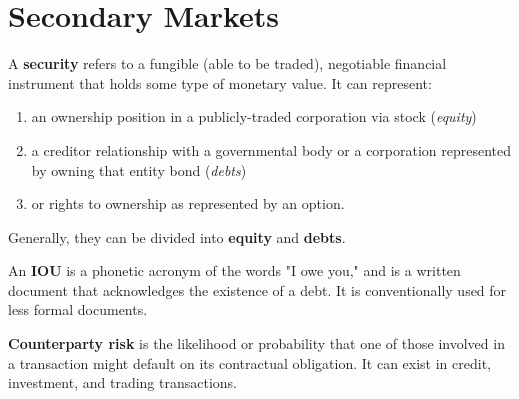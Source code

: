 \documentclass{article}
\begin{document}
\section{Secondary Markets}

    \begin{definition}[Securities]
      A \textbf{security} refers to a fungible (able to be traded), negotiable financial instrument that holds some type of monetary value. It can represent: 
      \begin{enumerate}
          \item an ownership position in a publicly-traded corporation via stock (\textit{equity})
          \item a creditor relationship with a governmental body or a corporation represented by owning that entity bond (\textit{debts})
          \item or rights to ownership as represented by an option. 
      \end{enumerate}
      Generally, they can be divided into \textbf{equity} and \textbf{debts}. 
    \end{definition}

    \begin{definition}[IOU]
      An \textbf{IOU} is a phonetic acronym of the words "I owe you," and is a written document that acknowledges the existence of a debt. It is conventionally used for less formal documents. 
    \end{definition}

    \begin{definition}
      \textbf{Counterparty risk} is the likelihood or probability that one of those involved in a transaction might default on its contractual obligation. It can exist in credit, investment, and trading transactions. 
    \end{definition}
\end{document}
